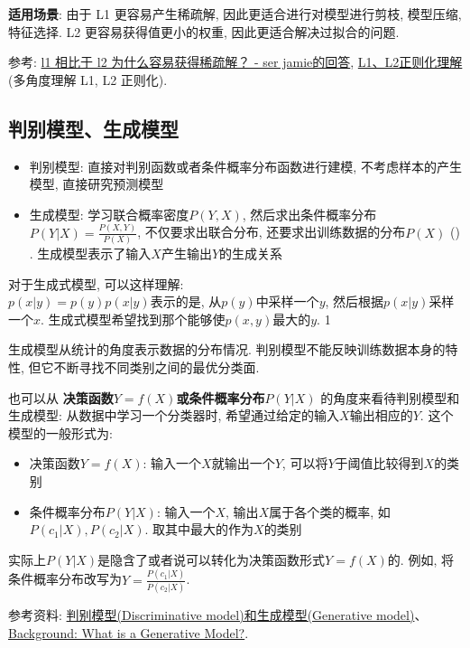 \textbf{适用场景}: 由于 L1 更容易产生稀疏解, 因此更适合进行对模型进行剪枝, 模型压缩, 特征选择. L2 更容易获得值更小的权重, 因此更适合解决过拟合的问题. 

参考: \href{https://www.zhihu.com/question/37096933/answer/475278057}{l1 相比于 l2 为什么容易获得稀疏解？ - ser jamie的回答}, \href{https://zhuanlan.zhihu.com/p/376282535}{L1、L2正则化理解} (多角度理解 L1, L2 正则化). 


\subsection{判别模型、生成模型}
\begin{itemize}
	\item 判别模型: 直接对判别函数或者条件概率分布函数进行建模, 不考虑样本的产生模型, 直接研究预测模型
	\item 生成模型: 学习联合概率密度$P(Y, X)$, 然后求出条件概率分布$P(Y|X) = \frac{P(X, Y)}{P(X)}$, 不仅要求出联合分布, 还要求出训练数据的分布$P(X)$ ({\color{red}{不一定要计算$p(X)$, 因为对于同一个样本, 计算它属于不同分类时, 其$p(X)$是一样的, 对判别没有帮助}}) . 生成模型表示了输入$X$产生输出$Y$的生成关系
\end{itemize}

对于生成式模型, 可以这样理解: \\
$p(x | y) = p(y)p(x | y)$表示的是, 从$p(y)$中采样一个$y$, 然后根据$p(x|y)$采样一个$x$. 生成式模型希望找到那个能够使$p(x, y)$最大的$y$. 1


生成模型从统计的角度表示数据的分布情况. 判别模型不能反映训练数据本身的特性, 但它不断寻找不同类别之间的最优分类面. 

也可以从 \textbf{决策函数$Y=f(X)$或条件概率分布$P(Y|X)$} 的角度来看待判别模型和生成模型: 
从数据中学习一个分类器时, 希望通过给定的输入$X$输出相应的$Y$. 这个模型的一般形式为: 
\begin{itemize}
	\item 决策函数$Y=f(X)$: 输入一个$X$就输出一个$Y$, 可以将$Y$于阈值比较得到$X$的类别
	\item 条件概率分布$P(Y|X)$: 输入一个$X$, 输出$X$属于各个类的概率, 如$P(c_1 | X), P(c_2 | X)$. 取其中最大的作为$X$的类别
\end{itemize}
实际上$P(Y|X)$是隐含了或者说可以转化为决策函数形式$Y=f(X)$的. 例如, 将条件概率分布改写为$Y = \frac{P(c_1 | X)}{P(c_2 | X) }$. 

参考资料: \href{https://blog.csdn.net/fishmemory/article/details/51711114}{判别模型(Discriminative model)和生成模型(Generative model)}、\href{https://developers.google.cn/machine-learning/gan/generative?hl=zh-cn}{Background: What is a Generative Model?}. 

